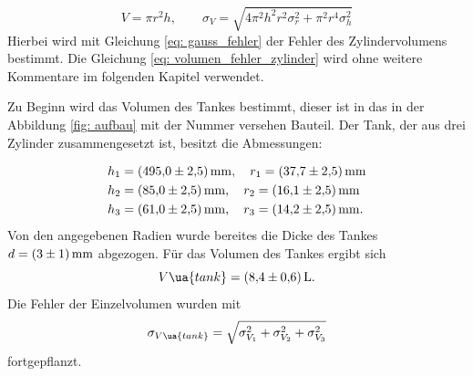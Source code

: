 \begin{equation}
  \label{eq: volumen_fehler_zylinder}
  V=\pi r^2 h, \qquad \sigma_{V}=\sqrt{4 \pi^{2} h^{2} r^{2} \sigma_{r}^{2}  + \pi^{2} r^{4} \sigma_{h}^{2} }
\end{equation}
Hierbei wird mit Gleichung \eqref{eq: gauss_fehler} der Fehler des Zylindervolumens bestimmt.
Die Gleichung \ref{eq: volumen_fehler_zylinder} wird ohne weitere Kommentare im folgenden Kapitel verwendet.

Zu Beginn wird das Volumen des Tankes bestimmt, dieser ist in das in der Abbildung \ref{fig: aufbau} mit der Nummer
 versehen Bauteil. %
Der Tank, der aus drei Zylinder zusammengesetzt ist, besitzt die Abmessungen: %

\begin{align*}
h_1&=\SI{495 \pm 2.5}{\milli\meter}, \quad r_1=\SI{37.7\pm2.5}{\milli\meter} \\
h_2&=\SI{85 \pm 2.5}{\milli\meter}, \quad r_2=\SI{16.1\pm 2.5}{\milli\meter} \\
h_3&=\SI{61 \pm 2.5}{\milli\meter}, \quad r_3=\SI{14.2\pm 2.5}{\milli\meter}. \\
\end{align*}
Von den angegebenen Radien wurde bereites die Dicke des Tankes $d=\SI{3\pm1}{\milli\meter}$ abgezogen. %
Für das Volumen des Tankes ergibt sich
\begin{equation}
  \label{eq:volumen Tank}
  V\ua{tank}=\SI{8.4\pm0.6}{\litre}.
\end{equation}
Die Fehler der Einzelvolumen wurden mit %
\begin{equation}
  \label{eq:fehler_addi}
  \sigma_{V\ua{tank}}=\sqrt{\sigma_{V_{1}}^{2} + \sigma_{V_{2}}^{2}+\sigma_{V_{3}}^{2}}
\end{equation}
fortgepflanzt.

